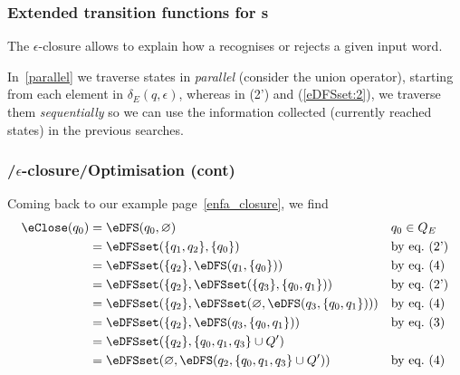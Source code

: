 % 
\begin{frame}
\frametitle{Extended transition functions for {\eNFA}s}

The \(\epsilon\)-closure allows to explain how a \eNFA recognises or
rejects a given input word.

\bigskip

In~\eqref{parallel} we traverse states in \emph{parallel} (consider
the union operator), starting from each element in \(\delta_E (q,
\epsilon)\), whereas in (2') and (\ref{eDFSset:2}), we traverse them
\emph{sequentially} so we can use the information collected (currently
reached states) in the previous searches.

\end{frame}

% 
\begin{frame}
\frametitle{\eNFA{}/\(\epsilon\)-closure/Optimisation (cont)}

Coming back to our example page~\ref{enfa_closure}, we find
\begin{align*}
   \eClose (q_0) 
&= \eDFS (q_0, \varnothing)
&& q_0 \in Q_E\\
&= \eDFSset (\{q_1, q_2\}, \{q_0\})
&& \text{by eq.~(2')}\\
&= \eDFSset (\{q_2\}, \eDFS (q_1, \{q_0\}))
&& \text{by eq.~(4)}\\
&= \eDFSset (\{q_2\}, \eDFSset (\{q_3\}, \{q_0,
   q_1\}))
&& \text{by eq.~(2')}\\
&= \eDFSset (\{q_2\}, \eDFSset (\varnothing, \eDFS (q_3, \{q_0, q_1\})))
&& \text{by eq.~(4)}\\
&= \eDFSset (\{q_2\}, \eDFS (q_3, \{q_0, q_1\}))
&& \text{by eq.~(3)}\\
&= \eDFSset (\{q_2\}, \{q_0, q_1, q_3\} \cup Q')\\
&= \eDFSset (\varnothing, \eDFS (q_2, \{q_0, q_1, q_3\} \cup Q'))
&& \text{by eq.~(4)}
\end{align*}

\end{frame}

